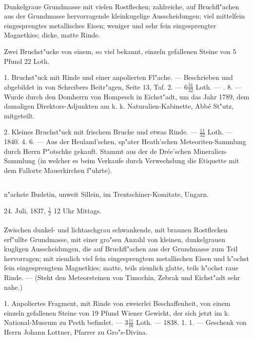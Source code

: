 \documentclass[a4paper, 11pt, oneside, polutonikogreek, german]{article}
\begin{document}
\paragraph{}
Dunkelgraue Grundmasse mit vielen Rostflecken; zahlreiche, auf Bruchfl"achen aus der Grundmasse hervorragende kleinkugelige Ausscheidungen; viel mittelfein eingesprengtes metallisches Eisen; weniger und sehr fein eingesprengter Magnetkies; dicke, matte Rinde.

Zwei Bruchst"ucke von einem, so viel bekannt, einzeln gefallenen Steine von 5 Pfund 22 Loth.

1. Bruchst"uck mit Rinde und einer anpolierten Fl"ache. --- Beschrieben und abgebildet in von Schreibers Beitr"agen, Seite 13, Taf. 2. --- $\mathfrak{6\frac{31}{32}}$ Loth. --- . 8. --- Wurde durch den Domherrn von Hompesch in Eichst"adt, um das Jahr 1789, dem damaligen Direktors-Adjunkten am k. k. Naturalien-Kabinette, Abbé St"utz, mitgeteilt.

2. Kleines Bruchst"uck mit frischem Bruche und etwas Rinde. --- $\mathfrak{\frac{11}{32}}$ Loth. --- 1840. 4. 6. --- Aus der Heuland'schen, sp"ater Heath'schen Meteoriten-Sammlung durch Herrn P"otschke gekauft. Stammt aus der de Drée'schen Mineralien-Sammlung (in welcher es beim Verkaufe durch Verwechslung die Etiquette mit dem Fallorte Mauerkirchen f"uhrte).
\subsection[\swabfamily {Gro"s-Divina.}]{}
\begin{center}

n"achste Budetin, unweit Sillein, im Trentschiner-Komitate, Ungarn.

24. Juli, 1837, $\mathfrak{\frac{1}{2}}$ 12 Uhr Mittags.
\end{center}
\paragraph{}
Zwischen dunkel- und lichtaschgrau schwankende, mit braunen Rostflecken erf"ullte Grundmasse, mit einer gro"sen Anzahl von kleinen, dunkelgrauen kugligen Ausscheidungen, die auf Bruchfl"achen aus der Grundmasse zum Teil hervorragen; mit ziemlich viel fein eingesprengtem metallischen Eisen und h"ochst fein eingesprengtem Magnetkies; matte, teils ziemlich glatte, teils h"ochst raue Rinde. --- (Steht den Meteorsteinen von Timochin, Zebrak und Eichst"adt sehr nahe.)

1. Anpoliertes Fragment, mit Rinde von zweierlei Beschaffenheit, von einem einzeln gefallenen Steine von 19 Pfund Wiener Gewicht, der sich jetzt im k. National-Museum zu Pesth befindet. --- $\mathfrak{3\frac{11}{16}}$ Loth. --- 1838. 1. 1. --- Geschenk von Herrn Johann Lottner, Pfarrer zu Gro"s-Divina.
\end{document}
